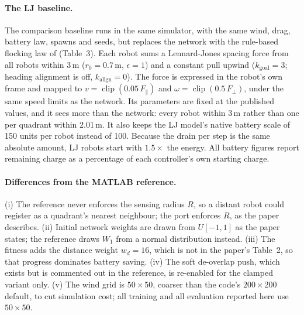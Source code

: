 \documentclass[11pt]{article}
\begin{document}
\paragraph{The LJ baseline.} The comparison baseline runs in the same simulator, with the same
wind, drag, battery law, spawns and seeds, but replaces the network with the rule-based
flocking law of \cite{mahdavi2026} (Table~3). Each robot sums a Lennard-Jones spacing force
from all robots within 3\,m ($r_0 = 0.7$\,m, $\epsilon = 1$) and a constant pull upwind
($k_{\text{goal}} = 3$; heading alignment is off, $k_{\text{align}} = 0$). The force is
expressed in the robot's own frame and mapped to
$v = \operatorname{clip}(0.05\,F_\parallel)$ and $\omega = \operatorname{clip}(0.5\,F_\perp)$,
under the same speed limits as the network. Its parameters are fixed at the published
values, and it sees more than the network: every robot within 3\,m rather than one per quadrant within 2.01\,m. It also keeps the
LJ model's native battery scale of 150 units per robot instead of 100. Because the drain per
step is the same absolute amount, LJ robots start with $1.5\times$ the energy. All battery
figures report remaining charge as a percentage of each controller's own starting charge.

\paragraph{Differences from the MATLAB reference.} (i) The reference never enforces the
sensing radius $R$, so a distant robot could register as a quadrant's nearest neighbour; the
port enforces $R$, as the paper describes. (ii) Initial network weights are drawn from
$U[-1, 1]$ as the paper states; the reference draws $W_1$ from a normal distribution instead.
(iii) The fitness adds the distance weight $w_d = 16$, which is not in the paper's Table~2,
so that progress dominates battery saving. (iv) The soft de-overlap push, which exists but
is commented out in the reference, is re-enabled for the clamped variant only.
(v) The wind grid is $50\times50$, coarser than the code's $200\times200$ default, to cut
simulation cost; all training and all evaluation reported here use $50\times50$.
\end{document}
